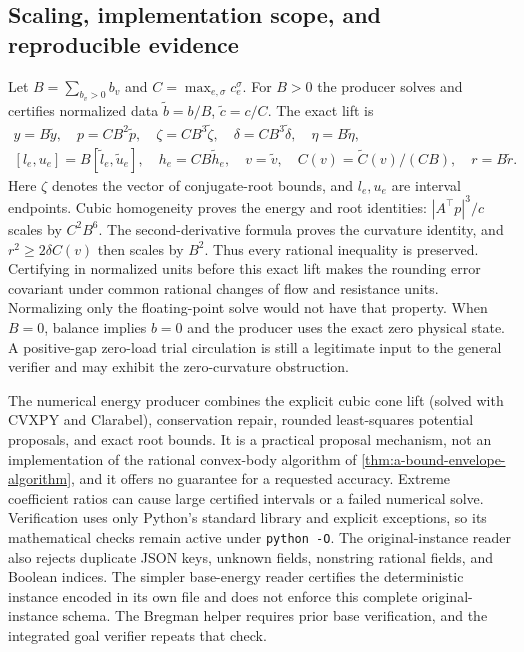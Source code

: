 \subsection{Scaling, implementation scope, and reproducible evidence}

Let $B=\sum_{b_v>0}b_v$ and $C=\max_{e,\sigma}c_e^\sigma$.
For $B>0$ the producer solves and certifies normalized data
$\widetilde b=b/B$, $\widetilde c=c/C$. The exact lift is
\begin{equation}
 \begin{gathered}
 y=B\widetilde y,\quad p=CB^2\widetilde p,\quad
 \zeta=CB^3\widetilde\zeta,\quad
 \delta=CB^3\widetilde\delta,\quad\eta=B\widetilde\eta,\\
 [l_e,u_e]=B[\widetilde l_e,\widetilde u_e],\quad
 h_e=CB\widetilde h_e,\quad
 v=\widetilde v,\quad C(v)=\widetilde C(v)/(CB),\quad
 r=B\widetilde r.
 \end{gathered}
 \label{eq:a-cert-scaling}
\end{equation}
Here $\zeta$ denotes the vector of conjugate-root bounds, and
$l_e,u_e$ are interval endpoints. Cubic homogeneity
proves the energy and root identities: $|A^\top p|^3/c$ scales
by $C^2B^6$. The second-derivative formula proves the curvature
identity, and $r^2\ge2\delta C(v)$ then scales by $B^2$.
Thus every rational inequality is preserved. Certifying in normalized
units before this exact lift makes the rounding error covariant under
common rational changes of flow and resistance units. Normalizing
only the floating-point solve would not have that property.
When $B=0$, balance implies $b=0$ and the producer uses the exact
zero physical state. A positive-gap zero-load trial circulation is
still a legitimate input to the general verifier and may exhibit the
zero-curvature obstruction.

The numerical energy producer combines the explicit cubic cone lift
(solved with CVXPY and Clarabel), conservation repair, rounded
least-squares potential proposals, and exact root bounds. It is a
practical proposal mechanism, not an implementation of the rational
convex-body algorithm of \cref{thm:a-bound-envelope-algorithm}, and it
offers no guarantee for a requested accuracy. Extreme coefficient
ratios can cause large certified intervals or a failed numerical solve.
Verification uses only Python's standard library and explicit
exceptions, so its mathematical checks remain active under
\texttt{python -O}. The original-instance reader also rejects duplicate
JSON keys, unknown fields, nonstring rational fields, and Boolean
indices. The simpler base-energy reader certifies the deterministic
instance encoded in its own file and does not enforce this complete
original-instance schema. The Bregman helper requires prior base
verification, and the integrated goal verifier repeats that check.

